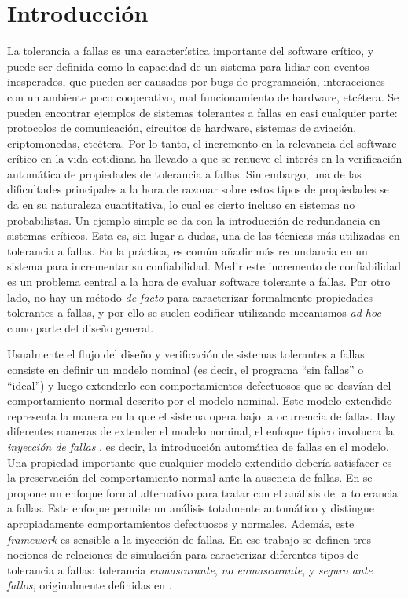 \section{Introducción} \label{sec:intro_mask}

La tolerancia a fallas es una característica importante del software crítico, y puede ser definida como la capacidad de un sistema para lidiar con eventos inesperados, que pueden ser causados por bugs de programación, interacciones con un ambiente poco cooperativo, mal funcionamiento de hardware, etcétera.
Se pueden encontrar ejemplos de sistemas tolerantes a fallas en casi cualquier parte: protocolos de comunicación, circuitos de hardware, sistemas de aviación, criptomonedas, etcétera.
Por lo tanto, el incremento en la relevancia del software crítico en la vida cotidiana ha llevado a que se renueve el interés en la verificación automática de propiedades de tolerancia a fallas. Sin embargo, una de las dificultades principales a la hora de razonar sobre estos tipos de propiedades se da en su naturaleza cuantitativa, lo cual es cierto incluso en sistemas no probabilistas.
Un ejemplo simple se da con la introducción de redundancia en sistemas críticos. Esta es, sin lugar a dudas, una de las técnicas más utilizadas en tolerancia a fallas.
En la práctica, es común añadir más redundancia en un sistema para incrementar su confiabilidad. Medir este incremento de confiabilidad es un problema central a la hora de evaluar software tolerante a fallas. Por otro lado, no hay un método \emph{de-facto} para caracterizar formalmente propiedades tolerantes a fallas, y por ello se suelen codificar utilizando mecanismos \emph{ad-hoc} como parte del diseño general.

Usualmente el flujo del diseño y verificación de sistemas tolerantes a fallas consiste en definir un modelo nominal (es decir, el programa ``sin fallas'' o ``ideal'') y luego extenderlo con comportamientos defectuosos que se desvían del comportamiento normal descrito por el modelo nominal.
Este modelo extendido representa la manera en la que el sistema opera bajo la ocurrencia de fallas.
Hay diferentes maneras de extender el modelo nominal, el enfoque típico involucra la \emph{inyección de fallas}  \cite{HsuehTI97,IyerNGK10}, es decir, la introducción automática de fallas en el modelo. Una propiedad importante que cualquier modelo extendido debería satisfacer es la preservación del comportamiento normal ante la ausencia de fallas.
En \cite{DemasiCMA17} se propone un enfoque formal alternativo para tratar con el análisis de la tolerancia a fallas. Este enfoque permite un análisis totalmente automático y distingue apropiadamente comportamientos defectuosos y normales. Además, este \textit{framework} es sensible a la inyección de fallas. En ese trabajo se definen tres nociones de relaciones de simulación para caracterizar diferentes tipos de tolerancia a fallas:
tolerancia \emph{enmascarante}, \emph{no enmascarante}, y \emph{seguro ante fallos}, originalmente definidas en \cite{Gartner99}. 

